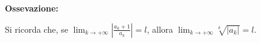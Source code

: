 \textbf{Ossevazione:}

Si ricorda che, se $\lim_{k\rightarrow+\infty}|\frac{a_k+1}{a_k}|=l$, allora $\lim_{k\rightarrow+\infty}\sqrt[k]{|a_k|}=l$.


\begin{comment}	
	


\paragraph{\textcolor{red}{Dimostrazione del teorema}}
Lo dimostriamo assumendo che esista $\lim_{k\rightarrow+\infty}\sqrt[k]{|a_k|}=\frac{1}{R}$.
\begin{enumerate}
	\item Dobbiamo dimostrare che la serie $\sum_{k=0}^{\infty}|a_kz^k|=\sum_{k=0}^{\infty}|a_k||z|^k$ converge se $|z|<R$.\\ Applichiamo il criterio della radice e calcoliamo $\lim_{k \rightarrow+\infty}\sqrt[k]{|a_k||z|^k}=\frac{|z|}{R}$. Se $\frac{|z|}{R}<1$, la serie converge.
	\item Dobbiamo dimostrare che, fissato $0<\delta<k$, la serie $\sum_{k=0}^{\infty}\sup_{|z|<\delta} |a_kz^k|$ converge.\\ Se $|z|<\delta \Rightarrow |a_kz^k|=|a_k||z|^k<|a_k|\delta^k$ e la serie $\sum_{k=0}^{\infty}|a_k|\delta^k$ converge perchè $\lim_{k \rightarrow+\infty} \sqrt[k]{|a_k|\delta^k}=\frac{\delta}{R}<1$. Allora $\sup_{|z|<\delta}|a_kz^k|<|a_k|\delta^k\,\, \forall k$ e quindi deduco la convergenza totale della serie in $B_{\delta}(0)$.
	\item Se $\frac{|z|}{R}>1$, il termine generale della serie non è infinitesimo, e quindi la serie non converge.
\end{enumerate}

\paragraph{\textcolor{red}{Esempio}}
$e^z=\sum_{k=0}^{\infty}\frac{z^k}{k!}$, esponenziale complesso. Calcoliamo il raggio di convergenza\\ $\lim_{k\rightarrow+\infty}\sqrt[k]{\frac{1}{k!}}=\lim_{k\rightarrow+\infty}\frac{1}{\sqrt[k]{k!}}$. $\lim_{k\rightarrow+\infty}\frac{\frac{1}{(k+1)!}}{\frac{1}{k!}}=\lim_{k\rightarrow+\infty}\frac{1}{k+1}=0\Rightarrow R=+\infty \Rightarrow$ la serie converge assolutamente in $\C$ e totalmente in $B_c(0) \,\, \forall \delta>0$.


\end{comment}
